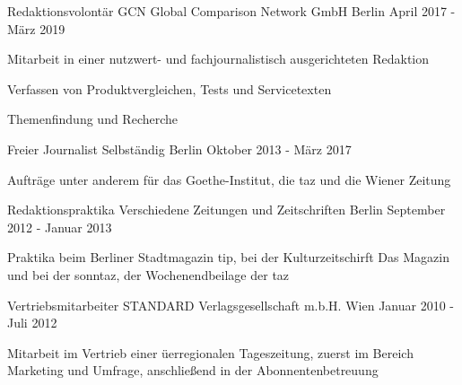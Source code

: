 \begin{cventries}
  \cventry
    {Redaktionsvolontär} %
    {GCN Global Comparison Network GmbH} %
    {Berlin} %
    {April 2017 - März 2019} %
    {
      \begin{cvitems} %
        \item {Mitarbeit in einer nutzwert- und fachjournalistisch ausgerichteten Redaktion}
        \item {Verfassen von Produktvergleichen, Tests und Servicetexten}
        \item {Themenfindung und Recherche}
       \end{cvitems}
    }

  \cventry
    {Freier Journalist} %
    {Selbständig} %
    {Berlin} %
    {Oktober 2013 - März 2017} %
    {
      \begin{cvitems} %
        \item {Aufträge unter anderem für das Goethe-Institut, die taz und die Wiener Zeitung}
       \end{cvitems}
    }

 \cventry
    {Redaktionspraktika} %
    {Verschiedene Zeitungen und Zeitschriften} %
    {Berlin} %
    {September 2012 - Januar 2013} %
    { 
      \begin{cvitems} %
        \item {Praktika beim Berliner Stadtmagazin tip, bei der Kulturzeitschirft Das Magazin und bei der sonntaz, der Wochenendbeilage der taz}
      \end{cvitems}
    }

  \cventry
    {Vertriebsmitarbeiter} %
    {STANDARD Verlagsgesellschaft m.b.H.} %
    {Wien} %
    {Januar 2010 - Juli 2012} %
    {
      \begin{cvitems} %
        \item {Mitarbeit im Vertrieb einer üerregionalen Tageszeitung, zuerst im Bereich Marketing und Umfrage, anschließend in der Abonnentenbetreuung}
      \end{cvitems}
    }

\end{cventries}
